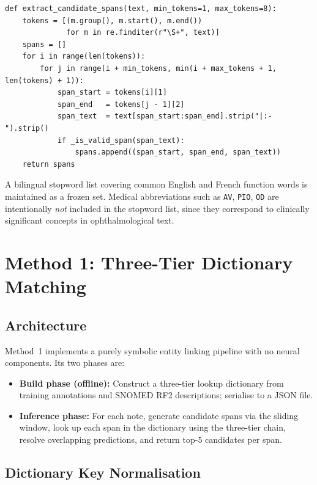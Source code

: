 \begin{verbatim}
def extract_candidate_spans(text, min_tokens=1, max_tokens=8):
    tokens = [(m.group(), m.start(), m.end())
              for m in re.finditer(r"\S+", text)]
    spans = []
    for i in range(len(tokens)):
        for j in range(i + min_tokens, min(i + max_tokens + 1, len(tokens) + 1)):
            span_start = tokens[i][1]
            span_end   = tokens[j - 1][2]
            span_text  = text[span_start:span_end].strip("|:- ").strip()
            if _is_valid_span(span_text):
                spans.append((span_start, span_end, span_text))
    return spans
\end{verbatim}

A bilingual stopword list covering common English and French function words is maintained as a frozen set. Medical abbreviations such as \texttt{AV}, \texttt{PIO}, \texttt{OD} are intentionally \textit{not} included in the stopword list, since they correspond to clinically significant concepts in ophthalmological text.

\section{Method 1: Three-Tier Dictionary Matching}

\subsection{Architecture}

Method~1 implements a purely symbolic entity linking pipeline with no neural components. Its two phases are:

\begin{itemize}
    \item \textbf{Build phase (offline):} Construct a three-tier lookup dictionary from training annotations and SNOMED RF2 descriptions; serialise to a JSON file.
    \item \textbf{Inference phase:} For each note, generate candidate spans via the sliding window, look up each span in the dictionary using the three-tier chain, resolve overlapping predictions, and return top-5 candidates per span.
\end{itemize}

\subsection{Dictionary Key Normalisation}

